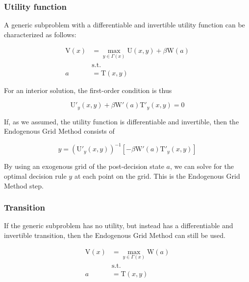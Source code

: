 \documentclass{article}
\newcommand{\DiscFac}{\beta}
\newcommand{\VFunc}{\mathrm{V}}
\newcommand{\PGro}{\Gamma}
\newcommand{\aRat}{a}
\newcommand{\xRat}{x}
\newcommand{\TFunc}{\mathrm{T}}
\newcommand{\UFunc}{\mathrm{U}}
\newcommand{\WFunc}{\mathrm{W}}
\newcommand{\yRat}{y}
\begin{document}
\subsubsection{Utility function}\label{Utility function}

A generic subproblem with a differentiable and invertible utility function can be characterized as follows:

\begin{equation}
\begin{split}
        \VFunc(\xRat) &  = \max_{\yRat  \in \PGro(\xRat)} \UFunc(\xRat, \yRat) + \DiscFac \WFunc(\aRat) \\
        & \text{s.t.} \\
        \aRat & = \TFunc(\xRat,\yRat)
    \end{split}
\end{equation}

For an interior solution, the first-order condition is thus

\begin{equation}
\UFunc'_{\yRat}(\xRat, \yRat) + \DiscFac \WFunc'(\aRat)\TFunc'_{\yRat}(\xRat,\yRat) = 0
\end{equation}

If, as we assumed, the utility function is differentiable and invertible, then the Endogenous Grid Method consists of

\begin{equation}
\yRat = \left(\UFunc'_{\yRat}(\xRat, \yRat)\right)^{-1} \left[ -\DiscFac \WFunc'(\aRat)\TFunc'_{\yRat}(\xRat,\yRat)\right]
\end{equation}

By using an exogenous grid of the post-decision state $\aRat$, we can solve for the optimal decision rule $\yRat$ at each point on the grid. This is the Endogenous Grid Method step.

\subsubsection{Transition}\label{Transition}

If the generic subproblem has no utility, but instead has a differentiable and invertible transition, then the Endogenous Grid Method can still be used.

\begin{equation}
\begin{split}
        \VFunc(\xRat) &  = \max_{\yRat  \in \PGro(\xRat)}  \WFunc(\aRat) \\
        & \text{s.t.} \\
        \aRat & = \TFunc(\xRat,\yRat)
    \end{split}
\end{equation}
\end{document}
